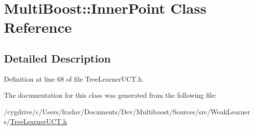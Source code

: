 \hypertarget{classMultiBoost_1_1InnerPoint}{
\section{MultiBoost::InnerPoint Class Reference}
\label{classMultiBoost_1_1InnerPoint}
}


\subsection{Detailed Description}


Definition at line 68 of file TreeLearnerUCT.h.



The documentation for this class was generated from the following file:\begin{DoxyCompactItemize}
\item 
/cygdrive/c/Users/fradav/Documents/Dev/Multiboost/Sources/src/WeakLearners/\hyperlink{TreeLearnerUCT_8h}{TreeLearnerUCT.h}\end{DoxyCompactItemize}

